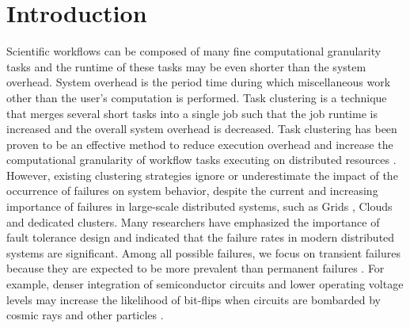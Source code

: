 \documentclass{IOS-Book-Article}
\begin{document}
\thispagestyle{empty}
\pagestyle{empty}

\section*{Introduction}


Scientific workflows can be composed of many fine computational granularity tasks and the runtime of these tasks may be even shorter than the system overhead. System overhead is the period time during which miscellaneous work other than the user’s computation is performed. Task clustering \cite{Chen2013a, Singh2008, Chen2012, Maheshwari2012, Ferreira-granularity-2013, Integration2012} is a technique that merges several short tasks into a single job such that the job runtime is increased and the overall system overhead is decreased. 
Task clustering has been proven to be an effective method to reduce execution overhead and increase the computational granularity of workflow tasks executing on distributed resources \cite{Ying2009, Singh2008, Chen2013a, Chen2012, Ferreira-granularity-2013}.
However, existing clustering strategies ignore or underestimate the impact of the occurrence of failures on system behavior, despite the current and increasing importance of failures in large-scale distributed systems, such as Grids \cite{Bresnahan2011, Deelman2004, Rubing2005}, Clouds \cite{Deelman2008, Berriman2010, Bresnahan2011} and dedicated clusters. Many researchers \cite{Zhang2004, Tang1990, Schroeder2006, Sahoo2004} have emphasized the importance of fault tolerance design and indicated that the failure rates in modern distributed systems are significant. Among all possible failures, we focus on transient failures because they are expected to be more prevalent than permanent failures \cite{Zhang2004}. For example, denser integration of semiconductor circuits and lower operating voltage levels may increase the likelihood of bit-flips when circuits are bombarded by cosmic rays and other particles \cite{Zhang2004}. 
\end{document}
